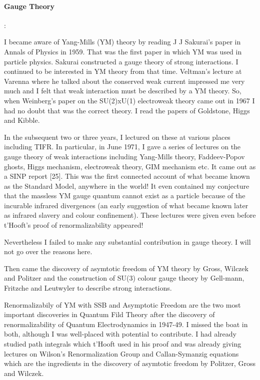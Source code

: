 \paragraph{Gauge Theory}:

I became aware of Yang-Mills (YM) theory by reading J J Sakurai's paper 
in Annals of Physics in 1959. That was the first paper in which YM was 
used in particle physics. Sakurai constructed a gauge theory of strong 
interactions. I continued to be interested in YM theory from that time. 
Veltman's lecture at Varenna where he talked about the conserved weak 
current impressed me very much and I felt that weak interaction must be 
described by a YM theory. So, when Weinberg's paper on the SU(2)xU(1) 
electroweak theory came out in 1967 I had no doubt that was the correct 
theory. I read the papers of Goldstone, Higgs and Kibble.

In the subsequent two or three years, I lectured on these at various 
places including TIFR. In particular, in June 1971, I gave a series of 
lectures on the gauge theory of weak interactions including Yang-Mills 
theory, Faddeev-Popov ghosts, Higgs mechanism, electroweak theory, GIM 
mechanism etc. It came out as a SINP report [25]. This was the first 
connected account of what became known as the Standard Model, anywhere 
in the world! It even contained my conjecture that the massless YM gauge 
quantum cannot exist as a particle because of the incurable infrared 
divergences (an early suggestion of what became known later as infrared 
slavery and colour confinement). These lectures were given even before 
t'Hooft's proof of renormalizability appeared!

Nevertheless I failed to make any substantial contribution in gauge 
theory. I will not go over the reasons here.

Then came the discovery of asymtotic freedom of YM theory by Gross, 
Wilczek and Politzer and the construction of SU(3) colour gauge theory 
by Gell-mann, Fritzche and Leutwyler to describe strong interactions.

Renormalizabily of YM with SSB and Asymptotic Freedom are the two most 
important discoveries in Quantum Fild Theory after the discovery of 
renormalizability of Quantum Electrodynamics in 1947-49. I missed the 
boat in both, although I was well-placed with potential to contribute. I 
had already studied path integrals which t'Hooft used in his proof and 
was already giving lectures on Wilson's Renormalization Group and 
Callan-Symanzig equations which are the ingredients in the discovery of 
asymtotic freedom by Politzer, Gross and Wilczek.

